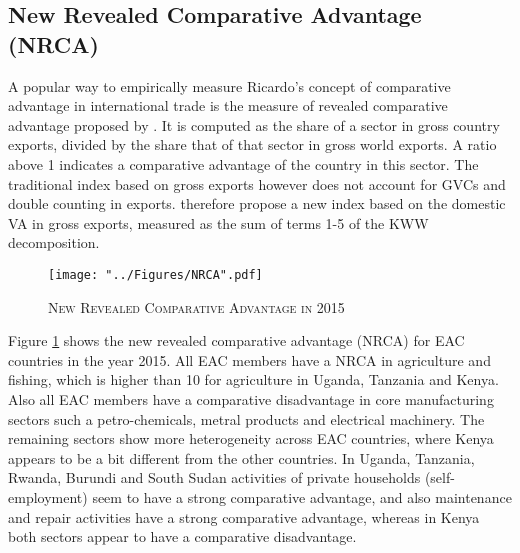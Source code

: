 \documentclass[a4paper]{article}
\begin{document}
\subsection{New Revealed Comparative Advantage (NRCA)}
A popular way to empirically measure Ricardo's concept of comparative advantage in international trade is the measure of revealed comparative advantage proposed by \citet{balassa1965trade}. It is computed as the share of a sector in gross country exports, divided by the share that of that sector in gross world exports. A ratio above 1 indicates a comparative advantage of the country in this sector. The traditional index based on gross exports however does not account for GVCs and double counting in exports. \citet{koopman2014tracing} therefore propose a new index based on the domestic VA in gross exports, measured as the sum of terms 1-5 of the KWW decomposition. %

\begin{figure}[h!]
\centering
\caption{\label{fig:NRCA}\textsc{New Revealed Comparative Advantage in 2015}}
\texttt{[image: "../Figures/NRCA".pdf]} %
\vspace{-10mm}
\end{figure}
\FloatBarrier

Figure \ref{fig:NRCA} shows the new revealed comparative advantage (NRCA) for EAC countries in the year 2015. All EAC members have a NRCA in agriculture and fishing, which is higher than 10 for agriculture in Uganda, Tanzania and Kenya. Also all EAC members have a comparative disadvantage in core manufacturing sectors such a petro-chemicals, metral products and electrical machinery. The remaining sectors show more heterogeneity across EAC countries, where Kenya appears to be a bit different from the other countries. In Uganda, Tanzania, Rwanda, Burundi and South Sudan activities of private households (self-employment) seem to have a strong comparative advantage, and also maintenance and repair activities have a strong comparative advantage, whereas in Kenya both sectors appear to have a comparative disadvantage. \newline
\end{document}
